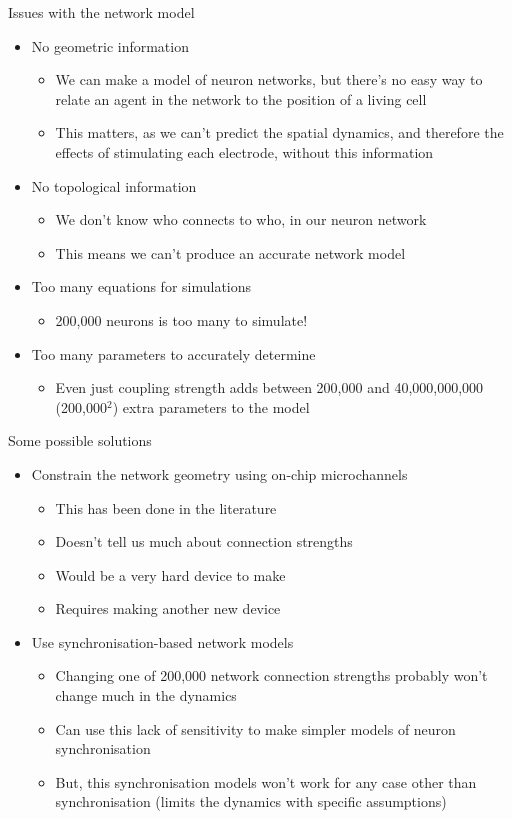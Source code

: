 \documentclass[presentation]{beamer}
\begin{document}
\begin{frame}[label={sec:org898d8af}]{Issues with the network model}
\begin{itemize}
\item No geometric information 
\begin{itemize}
\item We can make a model of neuron networks, but there's no easy way to relate an agent in the network to the position of a living cell
\item This matters, as we can't predict the spatial dynamics, and therefore the effects of stimulating each electrode, without this information
\end{itemize}
\item No topological information
\begin{itemize}
\item We don't know who connects to who, in our neuron network
\item This means we can't produce an accurate network model
\end{itemize}
\item Too many equations for simulations
\begin{itemize}
\item 200,000 neurons is too many to simulate!
\end{itemize}
\item Too many parameters to accurately determine
\begin{itemize}
\item Even just coupling strength adds between 200,000 and 40,000,000,000 (200,000\(^{\text{2}}\)) extra parameters to the model
\end{itemize}
\end{itemize}
\end{frame}

\begin{frame}[label={sec:org27bd80a}]{Some possible solutions}
\begin{itemize}
\item Constrain the network geometry using on-chip microchannels
\begin{itemize}
\item This has been done in the literature
\item Doesn't tell us much about connection strengths
\item Would be a very hard device to make
\item Requires making another new device
\end{itemize}
\item Use synchronisation-based network models
\begin{itemize}
\item Changing one of 200,000 network connection strengths probably won't change much in the dynamics
\item Can use this lack of sensitivity to make simpler models of neuron synchronisation
\item But, this synchronisation models won't work for any case other than synchronisation (limits the dynamics with specific assumptions)
\end{itemize}
\end{itemize}
\end{frame}
\end{document}
